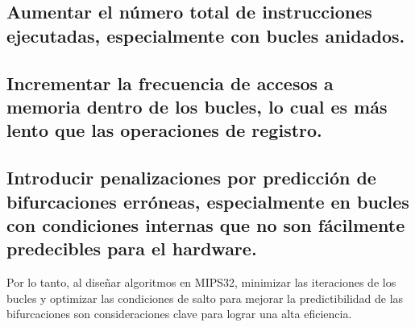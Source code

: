 \documentclass{article}
\begin{document}
\subsection{  Aumentar el número total de instrucciones ejecutadas, especialmente con bucles anidados.}
\subsection{  Incrementar la frecuencia de accesos a memoria dentro de los bucles, lo cual es más lento que las operaciones de registro.}
\subsection{  Introducir penalizaciones por predicción de bifurcaciones erróneas, especialmente en bucles con condiciones internas que no son fácilmente predecibles para el hardware.}
Por lo tanto, al diseñar algoritmos en MIPS32, minimizar las iteraciones de los bucles y optimizar las condiciones de salto para mejorar la predictibilidad de las bifurcaciones son consideraciones clave para lograr una alta eficiencia.
\end{document}
